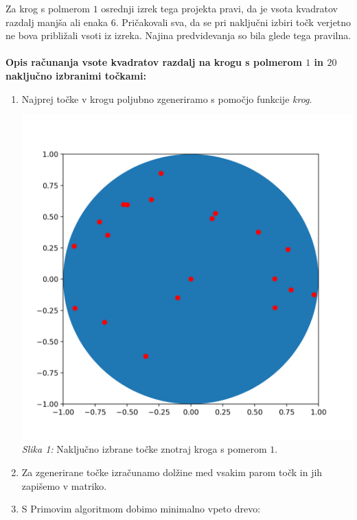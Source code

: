 \documentclass[a4paper]{article}
\begin{document}
Za krog s polmerom $1$ osrednji izrek tega projekta pravi, da je vsota kvadratov razdalj manjša ali enaka $6$. Pričakovali sva, da se pri naključni izbiri točk verjetno ne bova približali vsoti iz izreka. Najina predvidevanja so bila glede tega pravilna. \\ \\
\textbf{Opis računanja vsote kvadratov razdalj na krogu s polmerom $1$ in $20$ naključno izbranimi točkami:}
\begin{enumerate}
\item Najprej točke v krogu poljubno zgeneriramo s pomočjo funkcije \textit{krog}.
\begin{center}
\includegraphics[scale = 0.3]{slikatockekrog}\\ 
\scriptsize{\textit{Slika 1: } Naključno izbrane točke znotraj kroga s pomerom $1$.}
\end{center}
\item Za zgenerirane točke izračunamo dolžine med vsakim parom točk in jih zapišemo v matriko. 
\item S Primovim algoritmom dobimo minimalno vpeto drevo:
\begin{center}

\end{center}
\end{enumerate}
\end{document}
